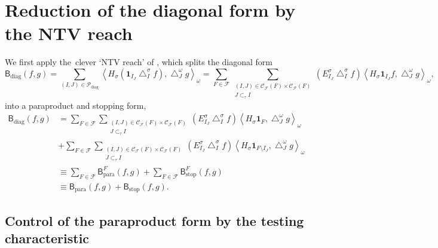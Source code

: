 \documentclass{amsart}%
\theoremstyle{plain}
\numberwithin{equation}{section}
\begin{document}
\section{Reduction of the diagonal form by the NTV reach}

We first apply the\ clever `NTV reach' of \cite{NTV3}, which splits the
diagonal form%
\[
\mathsf{B}_{\operatorname{diag}}\left(  f,g\right)  =\sum_{\left(  I,J\right)
\in\mathcal{P}_{\operatorname{diag}}}\left\langle H_{\sigma}\left(
\mathbf{1}_{I_{J}}\bigtriangleup_{I}^{\sigma}f\right)  ,\bigtriangleup
_{J}^{\omega}g\right\rangle _{\omega}=\sum_{F\in\mathcal{F}}\sum
_{\substack{\left(  I,J\right)  \in\mathcal{C}_{\mathcal{F}}\left(  F\right)
\times\mathcal{C}_{\mathcal{F}}\left(  F\right)  \\J\subset_{\tau}I}}\left(
E_{I_{J}}^{\sigma}\bigtriangleup_{I}^{\sigma}f\right)  \left\langle H_{\sigma
}\mathbf{1}_{I_{J}}f,\bigtriangleup_{J}^{\omega}g\right\rangle _{\omega},
\]
into a paraproduct and stopping form,%
\begin{align*}
\mathsf{B}_{\operatorname{diag}}\left(  f,g\right)   & =\sum_{F\in\mathcal{F}%
}\sum_{\substack{\left(  I,J\right)  \in\mathcal{C}_{\mathcal{F}}\left(
F\right)  \times\mathcal{C}_{\mathcal{F}}\left(  F\right)  \\J\subset_{\tau}%
I}}\left(  E_{I_{J}}^{\sigma}\bigtriangleup_{I}^{\sigma}f\right)  \left\langle
H_{\sigma}\mathbf{1}_{F},\bigtriangleup_{J}^{\omega}g\right\rangle _{\omega}\\
& +\sum_{F\in\mathcal{F}}\sum_{\substack{\left(  I,J\right)  \in
\mathcal{C}_{\mathcal{F}}\left(  F\right)  \times\mathcal{C}_{\mathcal{F}%
}\left(  F\right)  \\J\subset_{\tau}I}}\left(  E_{I_{J}}^{\sigma
}\bigtriangleup_{I}^{\sigma}f\right)  \left\langle H_{\sigma}\mathbf{1}%
_{F\setminus I_{J}},\bigtriangleup_{J}^{\omega}g\right\rangle _{\omega}\\
& \equiv\sum_{F\in\mathcal{F}}\mathsf{B}_{\operatorname*{para}}^{F}\left(
f,g\right)  +\sum_{F\in\mathcal{F}}\mathsf{B}_{\operatorname*{stop}}%
^{F}\left(  f,g\right) \\
& \equiv\mathsf{B}_{\operatorname*{para}}\left(  f,g\right)  +\mathsf{B}%
_{\operatorname*{stop}}\left(  f,g\right)  .
\end{align*}


\subsection{Control of the paraproduct form by the testing characteristic}
\end{document}
